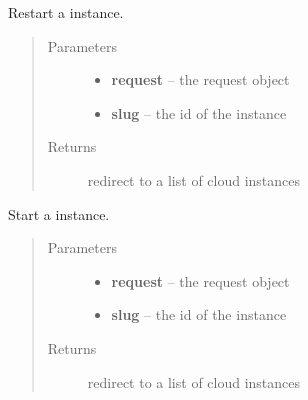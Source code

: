 \documentclass[letterpaper,10pt,english]{sphinxmanual}
\begin{document}
\begin{fulllineitems}
\label{api/cloud:limeade.cloud.views.instance.instance_restart}
Restart a instance.
\begin{quote}\begin{description}
\item[{Parameters}] \leavevmode\begin{itemize}
\item {} 
\textbf{request} -- the request object

\item {} 
\textbf{slug} -- the id of the instance

\end{itemize}

\item[{Returns}] \leavevmode
redirect to a list of cloud instances

\end{description}\end{quote}

\end{fulllineitems}


\begin{fulllineitems}
\label{api/cloud:limeade.cloud.views.instance.instance_start}
Start a instance.
\begin{quote}\begin{description}
\item[{Parameters}] \leavevmode\begin{itemize}
\item {} 
\textbf{request} -- the request object

\item {} 
\textbf{slug} -- the id of the instance

\end{itemize}

\item[{Returns}] \leavevmode
redirect to a list of cloud instances

\end{description}\end{quote}

\end{fulllineitems}
\end{document}
